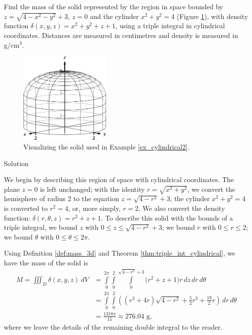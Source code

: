 \begin{example}
\label{ex_cylindrical2}Find the mass of the solid represented by the region in space bounded by $z=\sqrt{4-x^2-y^2}+3$, $z=0$ and the cylinder $x^2+y^2=4$ (Figure \ref{fig_multiple_29}), with density function $\delta(x,y,z) = x^2+y^2+z+1$, using a triple integral in cylindrical coordinates. Distances are measured in centimetres and density is measured in g/cm$^3$.

\begin{figure}[H]
	\begin{center}
			\includegraphics[width=0.4\textwidth]{fig_multiple_29}
	\caption{Visualizing the solid used in Example \ref{ex_cylindrical2}.}
	\label{fig_multiple_29}
	\end{center}
\end{figure}

Solution 

We begin by describing this region of space with cylindrical coordinates. The plane $z=0$ is left unchanged; with the identity $r=\sqrt{x^2+y^2}$, we convert the hemisphere of radius 2 to the equation $z=\sqrt{4-r^2} + 3$; the cylinder $x^2+y^2=4$ is converted to $r^2=4$, or, more simply, $r=2$.  We also convert the density function: $\delta(r,\theta,z) = r^2+z+1$. To describe this solid with the bounds of a triple integral, we bound $z$ with $0\leq z\leq \sqrt{4-r^2}+3$; we bound $r$ with $0 \leq r \leq 2$; we bound $\theta$ with $0 \leq \theta \leq 2\pi$.

Using Definition \ref{def:mass_3d} and Theorem \ref{thm:triple_int_cylindrical}, we have the mass of the solid is
\begin{align*}
M=\iiint_D\delta(x,y,z)\ dV &= \int\limits_0^{2\pi}\int\limits_0^2\int\limits_0^{\sqrt{4-r^2}+3}\big(r^2+z+1\big)r\,dz\,dr\,d\theta \\[0.2cm]
&= \int\limits_0^{2\pi}\int\limits_0^2\left((r^3+4r)\sqrt{4-r^2}+\frac52r^3+\frac{19}2r\right)\,dr\,d\theta \\[0.2cm]
&= \frac{1318\pi}{15} \approx 276.04\text{ g},
\end{align*}
where we leave the details of the remaining double integral to the reader.
\end{example}




